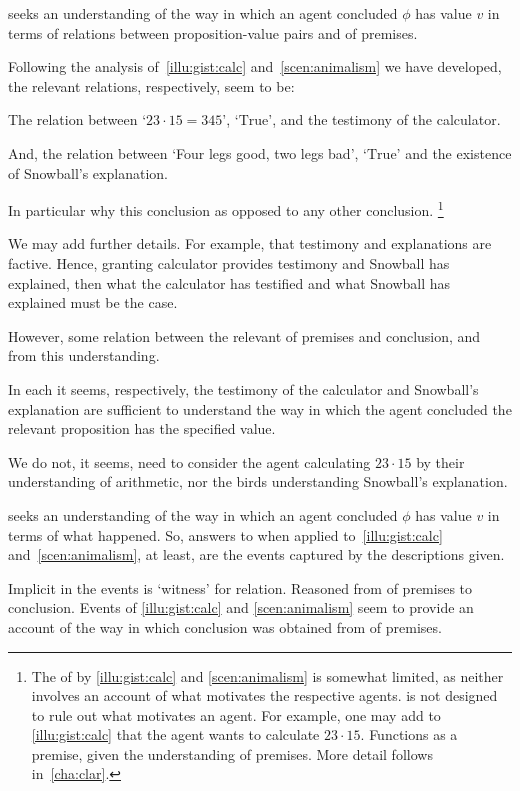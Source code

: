 \begin{note}
  \qWhy{} seeks an understanding of the way in which an agent concluded \(\phi\) has value \(v\) in terms of relations between proposition-value pairs and  of premises.

  Following the analysis of~\autoref{illu:gist:calc} and~\autoref{scen:animalism} we have developed, the relevant relations, respectively, seem to be:
  \begin{enumerate*}[label=]
  \item
    The relation between `\(23 \cdot 15 = 345\)', `\(\text{True}\)', and the testimony of the calculator.
  \item
    And, the relation between `Four legs good, two legs bad', `\(\text{True}\)' and the existence of Snowball's explanation.
  \end{enumerate*}

  In particular why this conclusion as opposed to any other conclusion.%
  \footnote{
    The  of \qWhy{} by \autoref{illu:gist:calc} and \autoref{scen:animalism} is somewhat limited, as neither  involves an account of what motivates the respective agents.
    \qWhy{} is not designed to rule out what motivates an agent.
    For example, one may add to \autoref{illu:gist:calc} that the agent wants to calculate \(23 \cdot 15\).
    Functions as a premise, given the understanding of premises.
    More detail follows in~\autoref{cha:clar}.
  }

  We may add further details.
  For example, that testimony and explanations are factive.
  Hence, granting calculator provides testimony and Snowball has explained, then what the calculator has testified and what Snowball has explained must be the case.

  However, some relation between the relevant \poP{} of premises and conclusion, and from this understanding.

  In each  it seems, respectively, the testimony of the calculator and Snowball's explanation are sufficient to understand the way in which the agent concluded the relevant proposition has the specified value.

  We do not, it seems, need to consider the agent calculating \(23 \cdot 15\) by their understanding of arithmetic, nor the birds understanding Snowball's explanation.
\end{note}

\begin{note}
  \qHow{} seeks an understanding of the way in which an agent concluded \(\phi\) has value \(v\) in terms of what happened.
  So, answers to \qHow{} when applied to~\autoref{illu:gist:calc} and~\autoref{scen:animalism}, at least, are the events captured by the descriptions given.

  Implicit in the events is `witness' for relation.
  Reasoned from \poP{} of premises to conclusion.
  Events of \autoref{illu:gist:calc} and \autoref{scen:animalism} seem to provide an account of the way in which conclusion was obtained from \poP{} of premises.
\end{note}

